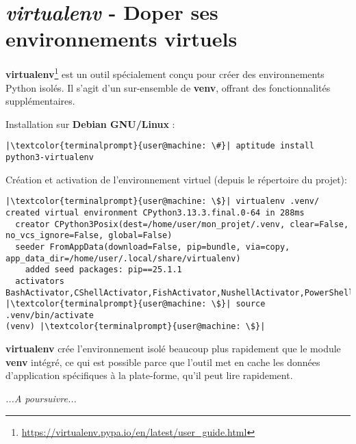 \chapter[\textit{virtualenv}]{\textit{virtualenv} - Doper ses environnements virtuels}

\textbf{virtualenv}\footnote{\url{https://virtualenv.pypa.io/en/latest/user_guide.html}} est un outil spécialement conçu pour créer des environnements Python isolés. Il s'agit d'un sur-ensemble de \textbf{venv}, offrant des fonctionnalités supplémentaires.

Installation sur \textbf{Debian GNU/Linux} :
\begin{lstlisting}[style=terminal]
|\textcolor{terminalprompt}{user@machine: \#}| aptitude install python3-virtualenv
\end{lstlisting}

Création et activation de l'environnement virtuel (depuis le répertoire du projet):
\begin{lstlisting}[style=terminal]
|\textcolor{terminalprompt}{user@machine: \$}| virtualenv .venv/
created virtual environment CPython3.13.3.final.0-64 in 288ms
  creator CPython3Posix(dest=/home/user/mon_projet/.venv, clear=False, no_vcs_ignore=False, global=False)
  seeder FromAppData(download=False, pip=bundle, via=copy, app_data_dir=/home/user/.local/share/virtualenv)
    added seed packages: pip==25.1.1
  activators BashActivator,CShellActivator,FishActivator,NushellActivator,PowerShellActivator,PythonActivator
|\textcolor{terminalprompt}{user@machine: \$}| source .venv/bin/activate
(venv) |\textcolor{terminalprompt}{user@machine: \$}|
\end{lstlisting}

\textbf{virtualenv} crée l'environnement isolé beaucoup plus rapidement que le module \textbf{venv} intégré, ce qui est possible parce que l'outil met en cache les données d'application spécifiques à la plate-forme, qu'il peut lire rapidement.

\Huge \textit{...A poursuivre...}

